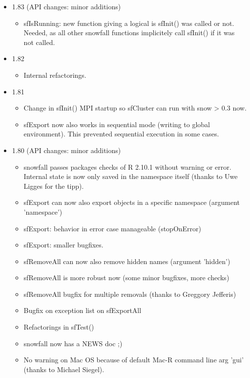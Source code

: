 \documentclass[10pt,oneside]{article}
\begin{document}
\begin{itemize}

\item 1.83 (API changes: minor additions)
  \begin{itemize}
  \item sfIsRunning: new function giving a logical is sfInit() was called or not. Needed, as all other snowfall functions implicitely call sfInit() if it was not called.
  \end{itemize}

\item 1.82
  \begin{itemize}
  \item Internal refactorings.
  \end{itemize}

\item 1.81
  \begin{itemize}
  \item Change in sfInit() MPI startup so sfCluster can run with snow > 0.3 now.
  \item sfExport now also works in sequential mode (writing to global environment). This prevented sequential execution in some cases.
  \end{itemize}

\item 1.80 (API changes: minor additions)
  \begin{itemize}
  \item snowfall passes packages checks of R 2.10.1 without warning or error. Internal state is now only saved in the namespace itself (thanks to Uwe Ligges for the tipp).
  \item sfExport can now also export objects in a specific namespace (argument 'namespace')
  \item sfExport: behavior in error case manageable (stopOnError)
  \item sfExport: smaller bugfixes.
  \item sfRemoveAll can now also remove hidden names (argument 'hidden')
  \item sfRemoveAll is more robust now (some minor bugfixes, more checks)
  \item sfRemoveAll bugfix for multiple removals (thanks to Greggory Jefferis)
  \item Bugfix on exception list on sfExportAll
  \item Refactorings in sfTest()
  \item snowfall now has a NEWS doc ;)
  \item No warning on Mac OS because of default Mac-R command line arg 'gui' (thanks to Michael Siegel).
  \end{itemize}


\end{itemize}
\end{document}
